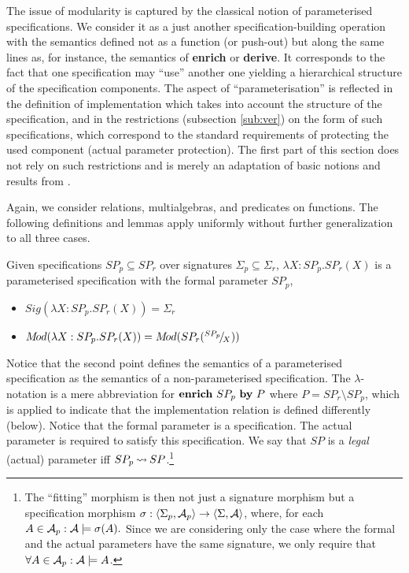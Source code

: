 The issue of modularity is captured by the classical notion of parameterised specifications.
We consider it as
a just another specification-building operation with the semantics defined not as a function (or push-out) but along the same lines as, for instance, the semantics of {\bf enrich} or {\bf derive}. It corresponds to the fact that
one specification may ``use'' another one yielding a hierarchical structure of the specification components. The aspect of ``parameterisation'' is reflected in the definition of implementation which takes into account the structure of the specification, and in the restrictions (subsection \ref{sub:ver}) on the form of such 
specifications, which correspond to the standard requirements of protecting the used component (actual parameter protection). The first part of this section does not rely on such restrictions and is merely an adaptation of basic notions and results from \cite{ST}.

Again, we consider relations, multialgebras, and predicates on functions. 
The following definitions and lemmas
apply uniformly without further generalization to all three cases. 

\begin{DEFINITION}\label{de:param}
Given specifications $SP_p\subseteq SP_r$ over signatures $\Sigma_p\subseteq\Sigma_r$,
$\lambda X:SP_p.SP_r(X)$ is a parameterised specification with the formal parameter $SP_p$,
\begin{itemize}\MyLPar
\item $Sig(\lambda X:SP_p.SP_r(X)) = \Sigma_r$ \item $M\!od(\lambda X:SP_p.SP_r(X)) = M\!od(SP_r(^{SP_p}\!/\!_X))$ \end{itemize}
\end{DEFINITION}
\noindent Notice that the second point defines the semantics of a parameterised
specification as the semantics of a non-parameterised specification. The $\lambda$-notation is a mere abbreviation 
for ${\bf enrich\ }SP_p\ {\bf by}\ P$ where $P=SP_r\setminus SP_p$, which is applied to indicate that the implementation relation is defined differently (below). 
Notice that the formal parameter is a specification. The actual parameter is required to satisfy this specification. We say that $SP$ is a {\em legal} (actual) parameter iff $SP_p\mathbin{\leadsto} SP$.\footnote{The ``fitting'' morphism is then not just a signature morphism
but a specification morphism $\sigma:\langle\Sigma_p,{\cal A}_p\rangle\rightarrow \langle\Sigma,{\cal A}\rangle$, where, for each $A\in{\cal A}_p : {\cal A}\models\sigma(A).$ Since we are considering only the case where the formal and the actual parameters have the same signature, we only require that $\forall A\in{\cal A}_p : {\cal A}\models A$.} 

